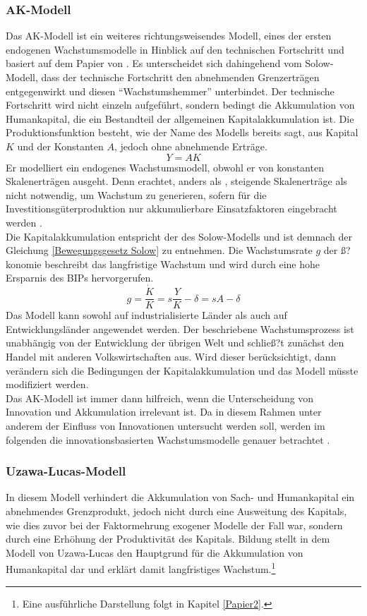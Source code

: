 \subsubsection*{AK-Modell}
%
Das AK-Modell ist ein weiteres richtungsweisendes Modell, eines der er\-sten endogenen Wachstumsmodelle in Hinblick auf den technischen Fortschritt und basiert auf dem Papier von \cite{Rebelo.1991}. Es unterscheidet sich dahingehend vom Solow-Modell, dass der technische Fortschritt den abnehmenden Grenzerträgen entgegenwirkt und diesen "`Wachstumshemmer"' unterbindet.  Der technische Fortschritt wird nicht einzeln aufgeführt, sondern bedingt die Akkumulation von Humankapital, die ein Bestandteil der allgemeinen Kapitalakkumulation ist. Die Produktionsfunktion besteht, wie der Name des Modells bereits sagt, aus Kapital $K$ und der Konstanten $A$, jedoch ohne abnehmende Erträge.
%
	\begin{equation}
		Y=AK
	\end{equation}
%
Er modelliert ein endogenes Wachstumsmodell, obwohl er von konstanten Skalenerträgen ausgeht. Denn \cite{Rebelo.1991} erachtet, anders als \cite{Romer.1990}, steigende Skalenerträge als nicht notwendig, um Wachstum zu generieren, sofern für die Investitionsgüterproduktion nur akkumulierbare Einsatzfaktoren eingebracht werden \cite{Rebelo.1991}. \\
%
Die Kapitalakkumulation entspricht der des Solow-Modells und ist demnach der Gleichung \eqref{Bewegungsgesetz Solow} zu entnehmen. Die Wachstumsrate $g$ der ß?konomie beschreibt das langfristige Wachstum und wird durch eine hohe Ersparnis des BIPs hervorgerufen.
%
	\begin{equation}
		g=\frac{\dot{K}}{K}=s\frac{Y}{K}-\delta=sA-\delta
	\end{equation}
%
Das Modell kann sowohl auf industrialisierte Länder als auch auf Entwicklungsländer angewendet werden. Der beschriebene  Wachstumsprozess ist unabhängig von der Entwicklung der übrigen Welt und schließ?t zunächst den Handel mit anderen Volkswirtschaften aus. Wird dieser berücksichtigt, dann verändern sich die Bedingungen der Kapitalakkumulation und das Modell müsste modifiziert werden.\\ Das AK-Modell ist immer dann hilfreich, wenn die Unterscheidung von Innovation und Akkumulation irrelevant ist. Da in diesem Rahmen unter anderem der Einfluss von Innovationen untersucht werden soll, werden im folgenden die innovationsbasierten Wachstumsmodelle genauer betrachtet \cite{Aghion.2015}.
%
\subsubsection*{Uzawa-Lucas-Modell} In diesem Modell verhindert die Akkumulation von Sach- und Humankapital ein abnehmendes Grenzprodukt, jedoch nicht durch eine Ausweitung des Kapitals, wie dies zuvor bei der Faktormehrung exogener Modelle der Fall war, sondern durch eine Erhöhung der Produktivität des Kapitals. Bildung stellt in dem Modell von Uzawa-Lucas den Hauptgrund für die Akkumulation von Humankapital dar und erklärt damit langfristiges Wachstum.\footnote{Eine ausführliche Darstellung folgt in Kapitel \ref{Papier2}.}
%
